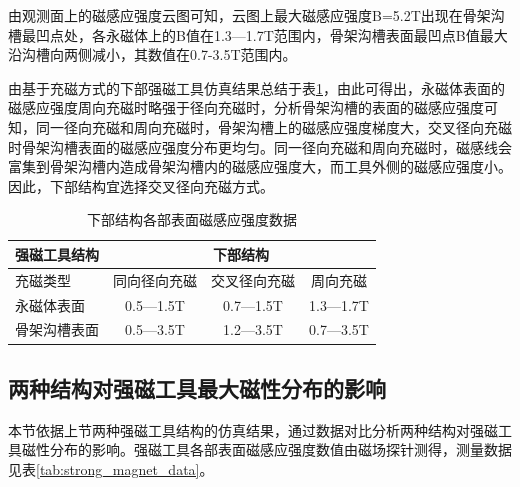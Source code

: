 由观测面上的磁感应强度云图可知，云图上最大磁感应强度B=5.2T出现在骨架沟槽最凹点处，各永磁体上的B值在1.3—1.7T范围内，骨架沟槽表面最凹点B值最大沿沟槽向两侧减小，其数值在0.7-3.5T范围内。


由基于充磁方式的下部强磁工具仿真结果总结于表\ref{tab:magnetic_intensity}，由此可得出，永磁体表面的磁感应强度周向充磁时略强于径向充磁时，分析骨架沟槽的表面的磁感应强度可知，同一径向充磁和周向充磁时，骨架沟槽上的磁感应强度梯度大，交叉径向充磁时骨架沟槽表面的磁感应强度分布更均匀。同一径向充磁和周向充磁时，磁感线会富集到骨架沟槽内造成骨架沟槽内的磁感应强度大，而工具外侧的磁感应强度小。因此，下部结构宜选择交叉径向充磁方式。

\begin{table}[htbp]
    \centering
    \caption{下部结构各部表面磁感应强度数据}
    \label{tab:magnetic_intensity}
    \begin{tabularx}{.9\textwidth}{Xccc} %
        \toprule
        强磁工具结构 & \multicolumn{3}{c}{下部结构} \\
        \midrule
        充磁类型 & 同向径向充磁 & 交叉径向充磁 & 周向充磁 \\
        \midrule
        永磁体表面 & 0.5---1.5T & 0.7---1.5T & 1.3---1.7T \\
        骨架沟槽表面 & 0.5---3.5T & 1.2---3.5T & 0.7---3.5T \\
        \bottomrule
    \end{tabularx}
\end{table}

\subsection{两种结构对强磁工具最大磁性分布的影响}

本节依据上节两种强磁工具结构的仿真结果，通过数据对比分析两种结构对强磁工具磁性分布的影响。强磁工具各部表面磁感应强度数值由磁场探针测得，测量数据见表\ref{tab:strong_magnet_data}。



